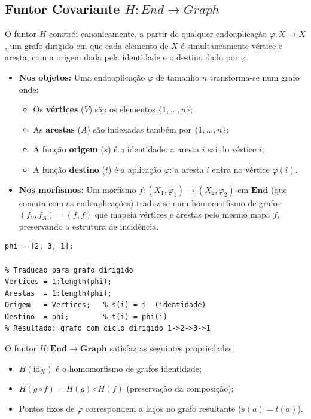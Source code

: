 \subsection{Funtor Covariante \texorpdfstring{$H: End \to Graph$}{H: End -> Graph}}

O funtor $H$ constrói canonicamente, a partir de qualquer endoaplicação $\varphi: X \to X$, um grafo dirigido em que cada elemento de $X$ é simultaneamente vértice e aresta, com a origem dada pela identidade e o destino dado por $\varphi$.

\begin{itemize}
    \item \textbf{Nos objetos:} Uma endoaplicação $\varphi$ de tamanho $n$ transforma-se num grafo onde:
    \begin{itemize}
        \item Os \textbf{vértices} ($V$) são os elementos $\{1, \ldots, n\}$;
        \item As \textbf{arestas} ($A$) são indexadas também por $\{1, \ldots, n\}$;
        \item A função \textbf{origem} ($s$) é a identidade: a aresta $i$ sai do vértice $i$;
        \item A função \textbf{destino} ($t$) é a aplicação $\varphi$: a aresta $i$ entra no vértice $\varphi(i)$.
    \end{itemize}
    \item \textbf{Nos morfismos:} Um morfismo $f: (X_1, \varphi_1) \to (X_2, \varphi_2)$ em $\mathbf{End}$ (que comuta com as endoaplicações) traduz-se num homomorfismo de grafos $(f_V, f_A) = (f, f)$ que mapeia vértices e arestas pelo mesmo mapa $f$, preservando a estrutura de incidência.
\end{itemize}

\begin{lstlisting}[style=matlab, caption={Funtor $H$ aplicado a uma endoaplicação $\varphi: \{1,2,3\} \to \{1,2,3\}$}]
% Endoaplicacao phi: ciclo fechado
phi = [2, 3, 1];

% Traducao para grafo dirigido
Vertices = 1:length(phi);
Arestas  = 1:length(phi);
Origem   = Vertices;   % s(i) = i  (identidade)
Destino  = phi;        % t(i) = phi(i)
% Resultado: grafo com ciclo dirigido 1->2->3->1
\end{lstlisting}

\begin{proposition}
O funtor $H: \mathbf{End} \to \mathbf{Graph}$ satisfaz as seguintes propriedades:
\begin{itemize}
    \item $H(\mathrm{id}_X)$ é o homomorfismo de grafos identidade;
    \item $H(g \circ f) = H(g) \circ H(f)$ (preservação da composição);
    \item Pontos fixos de $\varphi$ correspondem a laços no grafo resultante ($s(a) = t(a)$).
\end{itemize}
\end{proposition}

